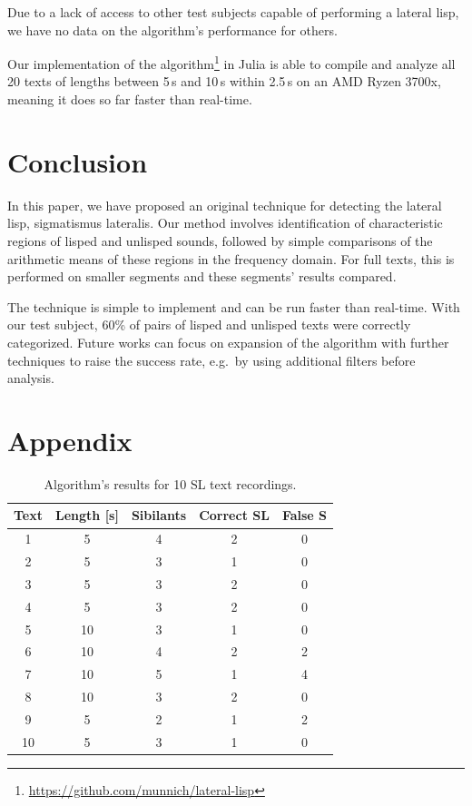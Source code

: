 \documentclass{IEEEtran}
\begin{document}
Due to a lack of access to other test subjects capable of performing a lateral lisp,
we have no data on the algorithm's performance for others.

Our implementation of the algorithm\footnote{\url{https://github.com/munnich/lateral-lisp}} in Julia is able to compile and analyze all 20 texts of lengths between 5\,s and 10\,s within 2.5\,s on an AMD Ryzen 3700x,
meaning it does so far faster than real-time.

\section{Conclusion}

In this paper,
we have proposed an original technique for detecting the lateral lisp,
sigmatismus lateralis.
Our method involves identification of characteristic regions of lisped and unlisped sounds,
followed by simple comparisons of the arithmetic means of these regions in the frequency domain.
For full texts,
this is performed on smaller segments and these segments' results compared.

The technique is simple to implement and can be run faster than real-time.
With our test subject,
60\% of pairs of lisped and unlisped texts were correctly categorized.
Future works can focus on expansion of the algorithm with further techniques to raise the success rate,
e.g.\ by using additional filters before analysis.

\nocite{*}

\printbibliography

\pagebreak

\section*{Appendix}

\centering

\begin{table}[h]
\centering
\caption{Algorithm's results for 10 SL text recordings.}\label{resultstablesl}
\begin{tabular}{ccccc}
Text & Length [s] & Sibilants & Correct SL & False S \\
\hline
1 & 5 & 4 & 2 & 0 \\
2 & 5 & 3 & 1 & 0 \\
3 & 5 & 3 & 2 & 0 \\
4 & 5 & 3 & 2 & 0 \\
5 & 10 & 3 & 1 & 0 \\
6 & 10 & 4 & 2 & 2 \\
7 & 10 & 5 & 1 & 4 \\
8 & 10 & 3 & 2 & 0 \\
9 & 5 & 2 & 1 & 2 \\
10 & 5 & 3 & 1 & 0
\end{tabular}

\end{table}
\end{document}
